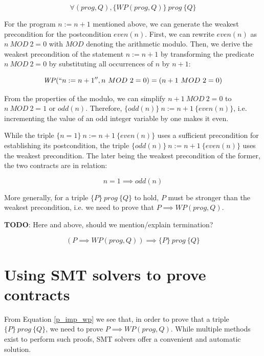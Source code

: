 \documentclass{kththesis}
\newcommand{\htriple}[3]{\ensuremath{\{#1\}~#2~\{#3\}}}
\newcommand{\WP}{\ensuremath{\mathit{WP}}}
\begin{document}
\begin{equation}
  \forall (prog, Q),
  \htriple{\WP(prog,Q)}{prog}{Q}
  \label{ht_wp_eq}
\end{equation}

For the program $n:=n+1$ mentioned above, we can generate the weakest precondition for the postcondition $even(n)$. First, we can rewrite $even(n)$ as $n~MOD~2 = 0$ with $MOD$ denoting the arithmetic modulo. Then, we derive the weakest precondition of the statement $n:=n+1$ by transforming the predicate $n~MOD~2 = 0$ by substituting all occurrences of $n$ by $n+1$:

\begin{equation}
  \WP(``n:=n+1'',n~MOD~2 = 0)=(n+1~MOD~2 = 0)
  \label{wp_comp_n_inc_even}
\end{equation}

From the properties of the modulo, we can simplify $n+1~MOD~2 = 0$ to $n~MOD~2 = 1$ or $odd(n)$. Therefore, \htriple{odd(n)}{n:=n+1}{even(n)}, i.e. incrementing the value of an odd integer variable by one makes it even.

While the triple \htriple{n=1}{n:=n+1}{even(n)} uses a sufficient precondition for establishing its postcondition, the triple \htriple{odd(n)}{n:=n+1}{even(n)} uses the weakest precondition. The later being the weakest precondition of the former, the two contracts are in relation:

\begin{equation}
  n=1 \implies odd(n)
\end{equation}

More generally, for a triple \htriple{P}{prog}{Q} to hold, $P$ must be stronger than the weakest precondition, i.e. we need to prove that $P \implies \WP(prog, Q)$.

\textbf{TODO}: Here and above, should we mention/explain termination?

\begin{equation}
  (P \implies \WP(prog, Q)) \implies \htriple{P}{prog}{Q}
  \label{p_imp_wp}
\end{equation}

\section{Using SMT solvers to prove contracts} \label{using-smt-to-prove-contracts}

From Equation \ref{p_imp_wp} we see that, in order to prove that a triple \htriple{P}{prog}{Q}, we need to prove $P \implies \WP(prog, Q)$. While multiple methods exist to perform such proofs, \acrshort{SMT} solvers offer a convenient and automatic solution.
\end{document}
